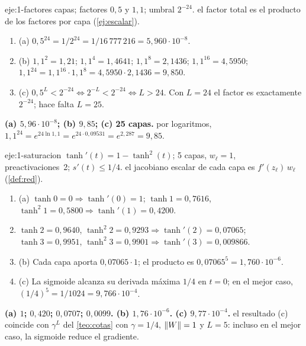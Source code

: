 \begin{solucion}{eje:1-factores}
 capas; factores $0{,}5$ y $1{,}1$; umbral $2^{-24}$.
\planteamiento el factor total es el producto de los factores por capa (\cref{ej:escalar}).
\pasos
\begin{enumerate}[label=\arabic*.]
  \item (a) $0{,}5^{24}=1/2^{24}=1/16\,777\,216=5{,}960\cdot 10^{-8}$.
  \item (b) $1{,}1^{2}=1{,}21$; $1{,}1^{4}=1{,}4641$; $1{,}1^{8}=2{,}1436$; $1{,}1^{16}=4{,}5950$; $1{,}1^{24}=1{,}1^{16}\cdot 1{,}1^{8}=4{,}5950\cdot 2{,}1436=9{,}850$.
  \item (c) $0{,}5^{L}<2^{-24}\iff 2^{-L}<2^{-24}\iff L>24$. Con $L=24$ el factor es exactamente $2^{-24}$; hace falta $L=25$.
\end{enumerate}
\resultado \textbf{(a) $5{,}96\cdot 10^{-8}$; (b) $9{,}85$; (c) 25 capas.}
\comprobacion por logaritmos, $1{,}1^{24}=e^{24\ln 1{,}1}=e^{24\cdot 0{,}09531}=e^{2{,}287}=9{,}85$.
\end{solucion}

\begin{solucion}{eje:1-saturacion}
\datos $\tanh'(t)=1-\tanh^{2}(t)$; 5 capas, $w_\ell=1$, preactivaciones~2; $s'(t)\le 1/4$.
\planteamiento el jacobiano escalar de cada capa es $f'(z_\ell)\,w_\ell$ (\cref{def:red}).
\pasos
\begin{enumerate}[label=\arabic*.]
  \item (a) $\tanh 0=0\Rightarrow\tanh'(0)=1$; $\tanh 1=0{,}7616$, $\tanh^{2}1=0{,}5800\Rightarrow\tanh'(1)=0{,}4200$.
  \item $\tanh 2=0{,}9640$, $\tanh^{2}2=0{,}9293\Rightarrow\tanh'(2)=0{,}07065$; $\tanh 3=0{,}9951$, $\tanh^{2}3=0{,}9901\Rightarrow\tanh'(3)=0{,}009866$.
  \item (b) Cada capa aporta $0{,}07065\cdot 1$; el producto es $0{,}07065^{5}=1{,}760\cdot 10^{-6}$.
  \item (c) La sigmoide alcanza su derivada máxima $1/4$ en $t=0$; en el mejor caso, $(1/4)^{5}=1/1024=9{,}766\cdot 10^{-4}$.
\end{enumerate}
\resultado \textbf{(a) $1$; $0{,}420$; $0{,}0707$; $0{,}0099$. (b) $1{,}76\cdot 10^{-6}$. (c) $9{,}77\cdot 10^{-4}$.}
\comprobacion el resultado (c) coincide con $\gamma^{L}$ del \cref{teo:cotas} con $\gamma=1/4$, $\lVert W\rVert=1$ y $L=5$: incluso en el mejor caso, la sigmoide reduce el gradiente.
\end{solucion}

